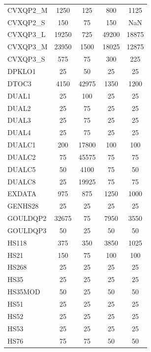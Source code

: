 \begin{longtable}{lcccc}
CVXQP2\_M &     1250 &   125 &      800 &     1125 \\
CVXQP2\_S &      150 &    75 &      150 &      NaN \\
CVXQP3\_L &    19250 &   725 &    49200 &    18875 \\
CVXQP3\_M &    23950 &  1500 &    18025 &    12875 \\
CVXQP3\_S &      575 &    75 &      300 &      225 \\
DPKLO1   &       25 &    50 &       25 &       25 \\
DTOC3    &     4150 & 42975 &     1350 &     1200 \\
DUAL1    &       25 &   100 &       25 &       25 \\
DUAL2    &       25 &    75 &       25 &       25 \\
DUAL3    &       25 &    75 &       25 &       25 \\
DUAL4    &       25 &    75 &       25 &       25 \\
DUALC1   &      200 & 17800 &      100 &      100 \\
DUALC2   &       75 & 45575 &       75 &       75 \\
DUALC5   &       50 &  4100 &       75 &       50 \\
DUALC8   &       25 & 19925 &       75 &       75 \\
EXDATA   &      975 &   875 &     1250 &     1000 \\
GENHS28  &       25 &    25 &       25 &       25 \\
GOULDQP2 &    32675 &    75 &     7950 &     3550 \\
GOULDQP3 &       50 &    25 &       50 &       50 \\
HS118    &      375 &   350 &     3850 &     1025 \\
HS21     &      150 &    75 &      100 &      100 \\
HS268    &       25 &    25 &       25 &       25 \\
HS35     &       25 &    25 &       25 &       25 \\
HS35MOD  &       50 &    25 &       50 &       50 \\
HS51     &       25 &    25 &       25 &       25 \\
HS52     &       25 &    25 &       25 &       25 \\
HS53     &       25 &    25 &       25 &       25 \\
HS76     &       75 &    75 &       50 &       50 \\

\end{longtable}
